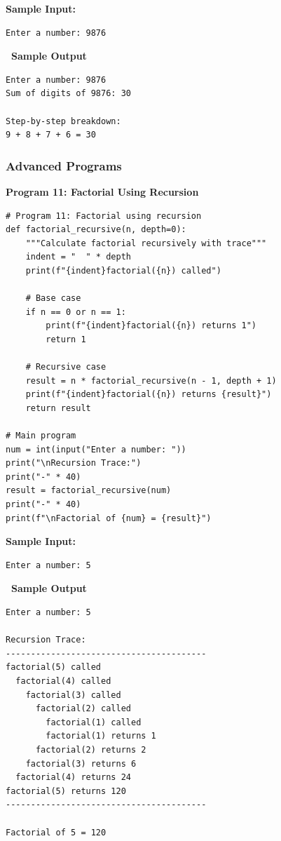 \documentclass[12pt,a4paper]{article}
\newcommand{\outhead}{\noindent\colorbox{cmrgreen!25}%
  {\textbf{\small\color{cmrdark}~Sample Output~}}\par\vspace{-1pt}}
\begin{document}
\textbf{Sample Input:}
\begin{verbatim}
Enter a number: 9876
\end{verbatim}

\outhead
\begin{lstlisting}[style=outputstyle]
Enter a number: 9876
Sum of digits of 9876: 30

Step-by-step breakdown:
9 + 8 + 7 + 6 = 30
\end{lstlisting}

\subsubsection{Advanced Programs}

\textbf{Program 11: Factorial Using Recursion}

\begin{lstlisting}
# Program 11: Factorial using recursion
def factorial_recursive(n, depth=0):
    """Calculate factorial recursively with trace"""
    indent = "  " * depth
    print(f"{indent}factorial({n}) called")
    
    # Base case
    if n == 0 or n == 1:
        print(f"{indent}factorial({n}) returns 1")
        return 1
    
    # Recursive case
    result = n * factorial_recursive(n - 1, depth + 1)
    print(f"{indent}factorial({n}) returns {result}")
    return result

# Main program
num = int(input("Enter a number: "))
print("\nRecursion Trace:")
print("-" * 40)
result = factorial_recursive(num)
print("-" * 40)
print(f"\nFactorial of {num} = {result}")
\end{lstlisting}

\textbf{Sample Input:}
\begin{verbatim}
Enter a number: 5
\end{verbatim}

\outhead
\begin{lstlisting}[style=outputstyle]
Enter a number: 5

Recursion Trace:
----------------------------------------
factorial(5) called
  factorial(4) called
    factorial(3) called
      factorial(2) called
        factorial(1) called
        factorial(1) returns 1
      factorial(2) returns 2
    factorial(3) returns 6
  factorial(4) returns 24
factorial(5) returns 120
----------------------------------------

Factorial of 5 = 120
\end{lstlisting}
\end{document}
